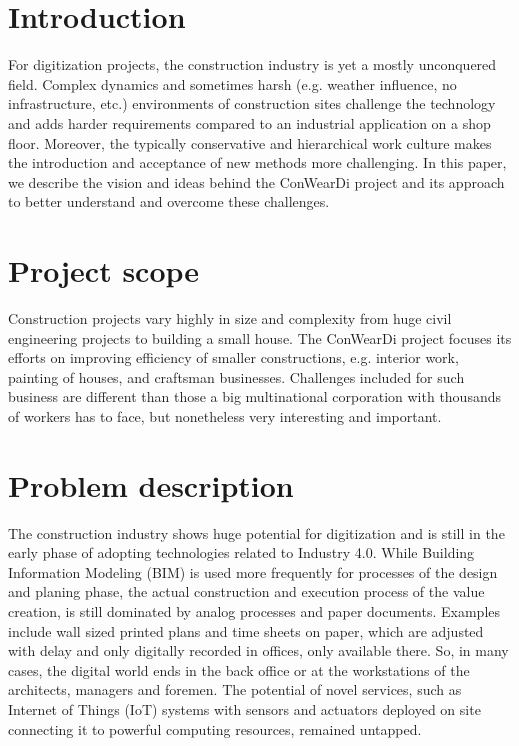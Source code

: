\section{Introduction}
For digitization projects, the construction industry is yet a mostly unconquered field.
Complex dynamics and sometimes harsh (e.g. weather influence, no infrastructure, etc.) environments of construction sites challenge the technology and adds harder requirements compared to an industrial application on a shop floor. 
Moreover, the typically conservative and hierarchical work culture makes the introduction and acceptance of new methods more challenging. In this paper, we describe the vision and ideas behind the ConWearDi project and its approach to better understand and overcome these challenges.

\section{Project scope}
Construction projects vary highly in size and complexity from huge civil engineering projects to building a small house. 
The ConWearDi project focuses its efforts on improving efficiency of smaller constructions, e.g. interior work, painting of houses, and craftsman businesses.
Challenges included for such business are different than those a big multinational corporation with thousands of workers has to face, but nonetheless very interesting and important.

\section{Problem description}
The construction industry shows huge potential for digitization and is still in the early phase of adopting technologies related to Industry 4.0. 
While Building Information Modeling (BIM) is used more frequently for processes of the design and planing phase, the actual construction and execution process of the value creation, is still dominated by analog processes and paper documents. 
Examples include wall sized printed plans and time sheets on paper, which are adjusted with delay and only digitally recorded in offices, only available there. 
So, in many cases, the digital world ends in the back office or at the workstations of the architects, managers and foremen. 
The potential of novel services, such as Internet of Things (IoT) systems with sensors and actuators deployed on site connecting it to powerful computing resources, remained untapped.

